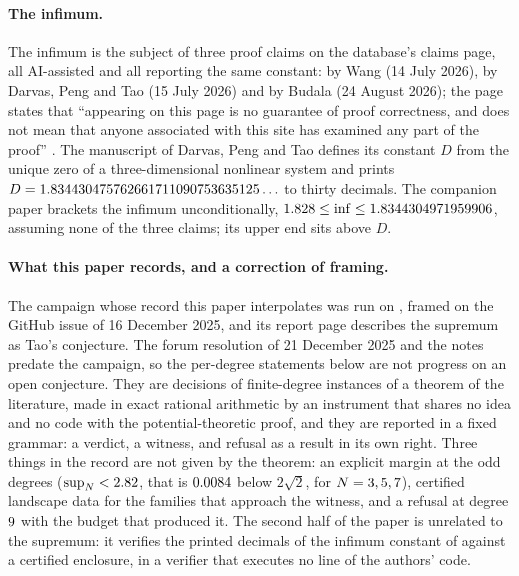 \documentclass[11pt]{article}
\begin{document}
\paragraph{The infimum.}
The infimum is the subject of three proof claims on the database's claims page, all
AI-assisted and all reporting the same constant: by Wang (14 July 2026), by Darvas, Peng and
Tao (15 July 2026) and by Budala (24 August 2026); the page states that ``appearing on this
page is no guarantee of proof correctness, and does not mean that anyone associated with this
site has examined any part of the proof'' \cite{Claims1038}. The manuscript of Darvas, Peng
and Tao \cite{DPT} defines its constant $D$ from the unique zero of a three-dimensional
nonlinear system and prints $D=1.834430475762661711090753635125\ldots$ to thirty decimals. The companion paper
\cite{Companion} brackets the infimum unconditionally, $1.828\le\inf\le1.8344304971959906$,
assuming none of the three claims; its upper end sits \InfUpperAboveD above $D$.

\paragraph{What this paper records, and a correction of framing.}
The campaign whose record this paper interpolates \cite{Repo} was run on \RecDate, framed on
the GitHub issue of 16 December 2025, and its report page describes the supremum as Tao's
conjecture. The forum resolution of 21 December 2025 and the notes \cite{TaoNotes} predate the
campaign, so the per-degree statements below are not progress on an open conjecture. They are
decisions of finite-degree instances of a theorem of the literature, made in exact rational
arithmetic by an instrument that shares no idea and no code with the potential-theoretic proof,
and they are reported in a fixed grammar: a verdict, a witness, and refusal as a result in its
own right. Three things in the record are not given by the theorem: an explicit margin at the
odd degrees ($\sup_N<2.82$, that is $0.0084$ below $2\sqrt2$, for $N=3, 5, 7$), certified
landscape data for the families that approach the witness, and a refusal at degree
$9$ with the budget that produced it. The second half of the paper is unrelated to
the supremum: it verifies the printed decimals of the infimum constant of \cite{DPT} against a
certified enclosure, in a verifier that executes no line of the authors' code.
\end{document}
